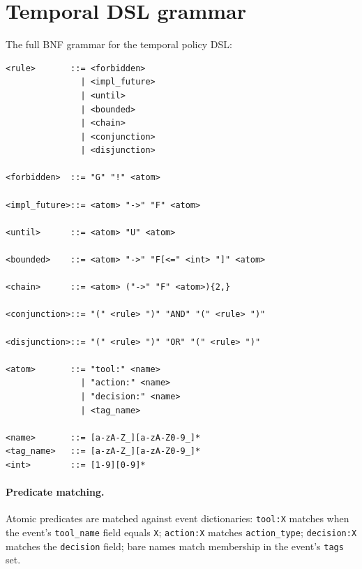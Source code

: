 \section{Temporal DSL grammar}
\label{app:grammar}

The full BNF grammar for the temporal policy DSL:

\begin{verbatim}
<rule>       ::= <forbidden>
               | <impl_future>
               | <until>
               | <bounded>
               | <chain>
               | <conjunction>
               | <disjunction>

<forbidden>  ::= "G" "!" <atom>

<impl_future>::= <atom> "->" "F" <atom>

<until>      ::= <atom> "U" <atom>

<bounded>    ::= <atom> "->" "F[<=" <int> "]" <atom>

<chain>      ::= <atom> ("->" "F" <atom>){2,}

<conjunction>::= "(" <rule> ")" "AND" "(" <rule> ")"

<disjunction>::= "(" <rule> ")" "OR" "(" <rule> ")"

<atom>       ::= "tool:" <name>
               | "action:" <name>
               | "decision:" <name>
               | <tag_name>

<name>       ::= [a-zA-Z_][a-zA-Z0-9_]*
<tag_name>   ::= [a-zA-Z_][a-zA-Z0-9_]*
<int>        ::= [1-9][0-9]*
\end{verbatim}

\paragraph{Predicate matching.}
Atomic predicates are matched against event dictionaries:
\texttt{tool:X} matches when the event's \texttt{tool\_name} field
equals \texttt{X}; \texttt{action:X} matches \texttt{action\_type};
\texttt{decision:X} matches the \texttt{decision} field; bare names
match membership in the event's \texttt{tags} set.

